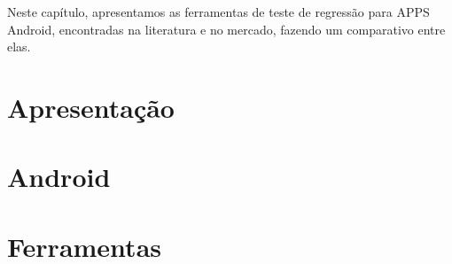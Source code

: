 
Neste capítulo, apresentamos as ferramentas de teste de regressão para \ac{APPS} Android, encontradas na literatura e no mercado, fazendo um comparativo entre elas.

\section{Apresentação}
\section{Android}
\section{Ferramentas}


